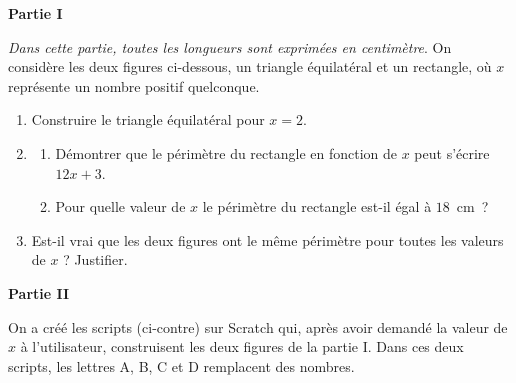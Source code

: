 \documentclass[exercice]{thedocument}%
\begin{document}
%
\textbf{Partie I}\smallskip\par\noindent
\begin{minipage}[c]{.3\linewidth}
    \emph{Dans cette partie, toutes les longueurs sont exprimées en centimètre}.
    On considère les deux figures ci-dessous, un triangle équilatéral
    et un rectangle, où $x$ représente un nombre positif quelconque.
\end{minipage}\hfil
{}\hfil%
\hfil
\begin{enumerate}
\item Construire le triangle équilatéral pour $x = 2$.
\item  
	\begin{enumerate}
		\item Démontrer que le périmètre du rectangle en fonction de $x$ peut s'écrire $12 x + 3$.
		\item Pour quelle valeur de $x$ le périmètre du rectangle est-il égal à $18$~cm~?
 	\end{enumerate}
\item  Est-il vrai que les deux figures ont le même périmètre pour toutes les valeurs de $x$ ?
Justifier.
\end{enumerate}\bigskip
\textbf{Partie II}\par\smallskip\noindent
On a créé les scripts (ci-contre) sur Scratch qui, après avoir
demandé la valeur de $x$ à l'utilisateur, construisent les deux figures de la partie I.
Dans ces deux scripts, les lettres A, B, C et D remplacent des nombres.\par\medskip
\small{\begin{scratch}
\end{scratch}}
\end{document}
